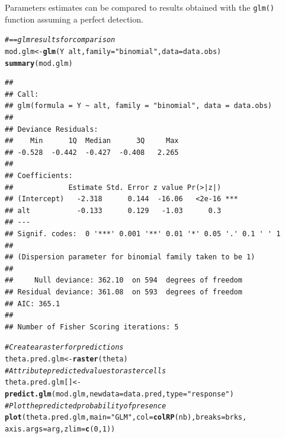 \documentclass[a4paper, 12pt, leqno]{article}\usepackage[]{graphicx}\usepackage[]{color}
\makeatletter
\newcommand{\hlnum}[1]{\textcolor[rgb]{0.686,0.059,0.569}{#1}}%
\newcommand{\hlstr}[1]{\textcolor[rgb]{0.192,0.494,0.8}{#1}}%
\newcommand{\hlcom}[1]{\textcolor[rgb]{0.678,0.584,0.686}{\textit{#1}}}%
\newcommand{\hlopt}[1]{\textcolor[rgb]{0,0,0}{#1}}%
\newcommand{\hlstd}[1]{\textcolor[rgb]{0.345,0.345,0.345}{#1}}%
\newcommand{\hlkwb}[1]{\textcolor[rgb]{0.69,0.353,0.396}{#1}}%
\newcommand{\hlkwc}[1]{\textcolor[rgb]{0.333,0.667,0.333}{#1}}%
\newcommand{\hlkwd}[1]{\textcolor[rgb]{0.737,0.353,0.396}{\textbf{#1}}}%
\newenvironment{kframe}{%
 \def\at@end@of@kframe{}%
 \ifinner\ifhmode%
  \def\at@end@of@kframe{\end{minipage}}%
  \begin{minipage}{\columnwidth}%
 \fi\fi%
 \def\FrameCommand##1{\hskip\@totalleftmargin \hskip-\fboxsep
 \colorbox{shadecolor}{##1}\hskip-\fboxsep
     \hskip-\linewidth \hskip-\@totalleftmargin \hskip\columnwidth}%
 \MakeFramed {\advance\hsize-\width
   \@totalleftmargin\z@ \linewidth\hsize
   \@setminipage}}%
 {\par\unskip\endMakeFramed%
 \at@end@of@kframe}
\newenvironment{knitrout}{}{} %
\makeatother
\begin{document}
Parameters estimates can be compared to results obtained with the \texttt{glm()} function
assuming a perfect detection.

\begin{knitrout}\small
{}\color{fgcolor}\begin{kframe}
\begin{alltt}
\hlcom{#== glm results for comparison}
\hlstd{mod.glm} \hlkwb{<-} \hlkwd{glm}\hlstd{(Y}\hlopt{~}\hlstd{alt,}\hlkwc{family}\hlstd{=}\hlstr{"binomial"}\hlstd{,}\hlkwc{data}\hlstd{=data.obs)}
\hlkwd{summary}\hlstd{(mod.glm)}
\end{alltt}
\begin{verbatim}
## 
## Call:
## glm(formula = Y ~ alt, family = "binomial", data = data.obs)
## 
## Deviance Residuals: 
##    Min      1Q  Median      3Q     Max  
## -0.528  -0.442  -0.427  -0.408   2.265  
## 
## Coefficients:
##             Estimate Std. Error z value Pr(>|z|)    
## (Intercept)   -2.318      0.144  -16.06   <2e-16 ***
## alt           -0.133      0.129   -1.03      0.3    
## ---
## Signif. codes:  0 '***' 0.001 '**' 0.01 '*' 0.05 '.' 0.1 ' ' 1
## 
## (Dispersion parameter for binomial family taken to be 1)
## 
##     Null deviance: 362.10  on 594  degrees of freedom
## Residual deviance: 361.08  on 593  degrees of freedom
## AIC: 365.1
## 
## Number of Fisher Scoring iterations: 5
\end{verbatim}
\end{kframe}
\end{knitrout}


\begin{knitrout}\small
{}\color{fgcolor}\begin{kframe}
\begin{alltt}
\hlcom{# Create a raster for predictions}
\hlstd{theta.pred.glm} \hlkwb{<-} \hlkwd{raster}\hlstd{(theta)}
\hlcom{# Attribute predicted values to raster cells}
\hlstd{theta.pred.glm[]} \hlkwb{<-} \hlkwd{predict.glm}\hlstd{(mod.glm,}\hlkwc{newdata}\hlstd{=data.pred,}\hlkwc{type}\hlstd{=}\hlstr{"response"}\hlstd{)}
\hlcom{# Plot the predicted probability of presence}
\hlkwd{plot}\hlstd{(theta.pred.glm,}\hlkwc{main}\hlstd{=}\hlstr{"GLM"}\hlstd{,}\hlkwc{col}\hlstd{=}\hlkwd{colRP}\hlstd{(nb),}\hlkwc{breaks}\hlstd{=brks,}
     \hlkwc{axis.args}\hlstd{=arg,}\hlkwc{zlim}\hlstd{=}\hlkwd{c}\hlstd{(}\hlnum{0}\hlstd{,}\hlnum{1}\hlstd{))}
\end{alltt}
\end{kframe}
\end{knitrout}
\end{document}

